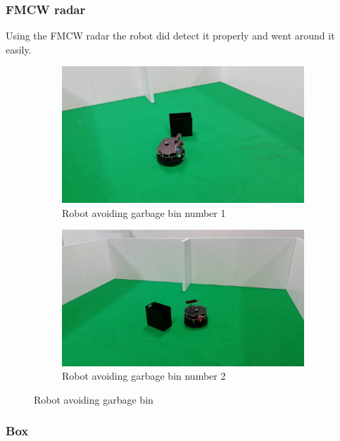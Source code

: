 \subsubsection*{FMCW radar}
Using the \ac{FMCW} radar the robot did detect it properly and went around it easily.
\begin{figure}[h!]
  \centering
  \begin{subfigure}[b]{0.49\linewidth}
    \includegraphics[width=\linewidth]{imgs/chapter5/garbageRS.png}
     \caption{Robot avoiding garbage bin number 1}
     \label{fig::wchair}
  \end{subfigure}
  \begin{subfigure}[b]{0.49\linewidth}
    \includegraphics[width=\linewidth]{imgs/chapter5/garbageRS2.png}
    \caption{Robot avoiding garbage bin  number 2}
    \label{fig::nchair}
  \end{subfigure}
  \caption{Robot avoiding garbage bin}
  \label{fig:nchairRS}
\end{figure}

\subsubsection{Box}
